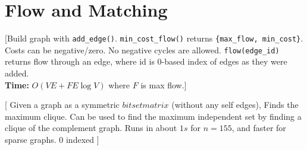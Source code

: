 \chapter{Flow and Matching}




%
[Build graph with \texttt{add\_edge()}. \texttt{min\_cost\_flow()} returns \texttt{\{max\_flow, min\_cost\}}. Costs can be negative/zero. No negative cycles are allowed.
\texttt{flow(edge\_id)} returns flow through an edge, where id is 0-based index of edges as they were added.\\
\textbf{Time:} {$O(VE + F E \log V)$} where $F$ is max flow.]


[
  Given a graph as a symmetric $bitset matrix$ (without any self edges), Finds the maximum clique.
  Can be used to find the maximum independent set by finding a clique of the complement graph.
  Runs in about $1s$ for $n=155$, and faster for sparse graphs. 0 indexed
]

